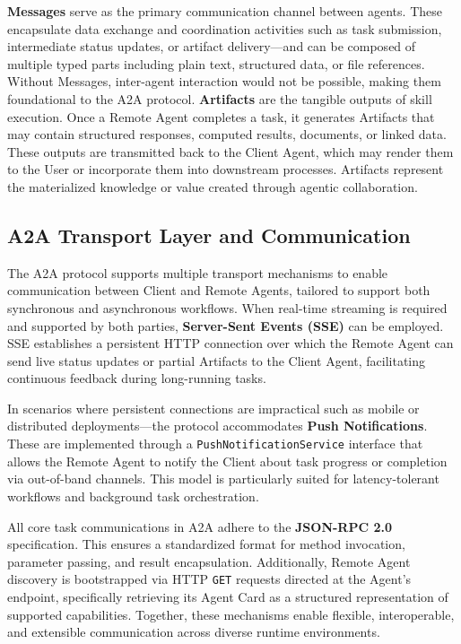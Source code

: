 \documentclass{article}
\begin{document}
\textbf{Messages} serve as the primary communication channel between agents. These encapsulate data exchange and coordination activities such as task submission, intermediate status updates, or artifact delivery—and can be composed of multiple typed parts including plain text, structured data, or file references. Without Messages, inter-agent interaction would not be possible, making them foundational to the A2A protocol.
 \textbf{Artifacts} are the tangible outputs of skill execution. Once a Remote Agent completes a task, it generates Artifacts that may contain structured responses, computed results, documents, or linked data. These outputs are transmitted back to the Client Agent, which may render them to the User or incorporate them into downstream processes. Artifacts represent the materialized knowledge or value created through agentic collaboration.





\subsection{A2A Transport Layer and Communication}

The A2A protocol supports multiple transport mechanisms to enable communication between Client and Remote Agents, tailored to support both synchronous and asynchronous workflows. When real-time streaming is required and supported by both parties, \textbf{Server-Sent Events (SSE)} can be employed. SSE establishes a persistent HTTP connection over which the Remote Agent can send live status updates or partial Artifacts to the Client Agent, facilitating continuous feedback during long-running tasks.

In scenarios where persistent connections are impractical such as mobile or distributed deployments—the protocol accommodates \textbf{Push Notifications}. These are implemented through a \texttt{PushNotificationService} interface that allows the Remote Agent to notify the Client about task progress or completion via out-of-band channels. This model is particularly suited for latency-tolerant workflows and background task orchestration.

All core task communications in A2A adhere to the \textbf{JSON-RPC 2.0} specification. This ensures a standardized format for method invocation, parameter passing, and result encapsulation. Additionally, Remote Agent discovery is bootstrapped via HTTP \texttt{GET} requests directed at the Agent’s endpoint, specifically retrieving its Agent Card as a structured representation of supported capabilities. Together, these mechanisms enable flexible, interoperable, and extensible communication across diverse runtime environments.
\end{document}
